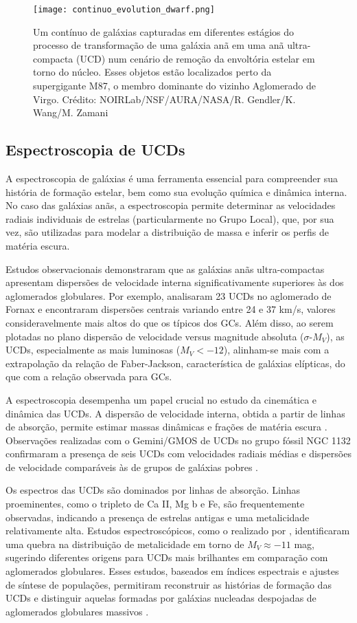 \begin{figure}[!ht]
    \centering
    \texttt{[image: continuo\_evolution\_dwarf.png]} 
    \caption[]{Um contínuo de galáxias capturadas em diferentes estágios do processo de transformação de uma galáxia anã em uma anã ultra-compacta (UCD) num cenário de remoção da envoltória estelar em torno do núcleo. Esses objetos estão localizados perto da supergigante M87, o membro dominante do vizinho Aglomerado de Virgo. Crédito: NOIRLab/NSF/AURA/NASA/R. Gendler/K. Wang/M. Zamani}
    \label{continuo_evolution_dwarf}
\end{figure}

\subsection{Espectroscopia de UCDs}\label{subsec:espectroscopia}
A espectroscopia de galáxias é uma ferramenta essencial para compreender sua história de formação estelar, bem como sua evolução química e dinâmica interna. No caso das galáxias anãs, a espectroscopia permite determinar as velocidades radiais individuais de estrelas (particularmente no Grupo Local), que, por sua vez, são utilizadas para modelar a distribuição de massa e inferir os perfis de matéria escura.

Estudos observacionais demonstraram que as galáxias anãs ultra-compactas apresentam dispersões de velocidade interna significativamente superiores às dos aglomerados globulares. Por exemplo, \cite{Mieske_2008_2} analisaram 23 UCDs no aglomerado de Fornax e encontraram dispersões centrais variando entre 24 e 37 km/s, valores consideravelmente mais altos do que os típicos dos GCs. Além disso, ao serem plotadas no plano dispersão de velocidade versus magnitude absoluta ($\sigma$-$M_V$), as UCDs, especialmente as mais luminosas ($M_V < -12$), alinham-se mais com a extrapolação da relação de Faber-Jackson, característica de galáxias elípticas, do que com a relação observada para GCs.

A espectroscopia desempenha um papel crucial no estudo da cinemática e dinâmica das UCDs. A dispersão de velocidade interna, obtida a partir de linhas de absorção, permite estimar massas dinâmicas e frações de matéria escura \citep{Chilingarian_2011}. Observações realizadas com o Gemini/GMOS de UCDs no grupo fóssil NGC 1132 confirmaram a presença de seis UCDs com velocidades radiais médias e dispersões de velocidade comparáveis às de grupos de galáxias pobres \citep{Madrid_2013}.

Os espectros das UCDs são dominados por linhas de absorção. Linhas proeminentes, como o tripleto de Ca II, Mg b e Fe, são frequentemente observadas, indicando a presença de estrelas antigas e uma metalicidade relativamente alta. Estudos espectroscópicos, como o realizado por \cite{Mieske_2006}, identificaram uma quebra na distribuição de metalicidade em torno de $M_V \approx -11$ mag, sugerindo diferentes origens para UCDs mais brilhantes em comparação com aglomerados globulares. Esses estudos, baseados em índices espectrais e ajustes de síntese de populações, permitiram reconstruir as histórias de formação das UCDs e distinguir aquelas formadas por galáxias nucleadas despojadas de aglomerados globulares massivos \citep{Mieske_2006}.

